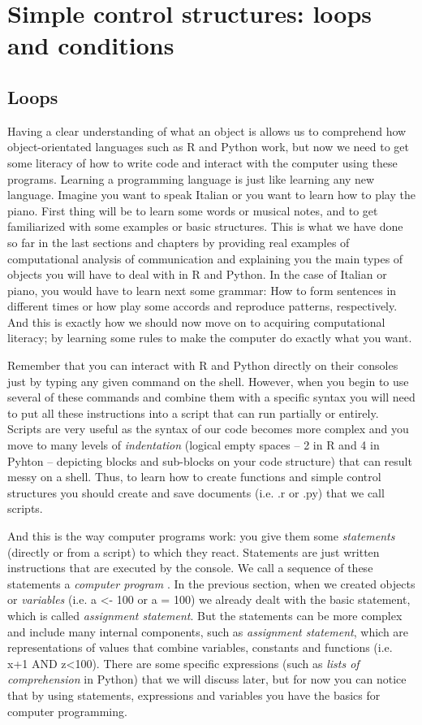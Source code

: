 \section{Simple control structures: loops and conditions}	

\subsection{Loops}
Having a clear understanding of what an object is allows us to
comprehend how object-orientated languages such as R and Python work,
but now we need to get some literacy of how to write code and interact
with the computer using these programs. Learning a programming
language is just like learning any new language.  Imagine you want to
speak Italian or you want to learn how to play the piano. First thing
will be to learn some words or musical notes, and to get familiarized
with some examples or basic structures. This is what we have done so
far in the last sections and chapters by providing real examples of
computational analysis of communication and explaining you the main
types of objects you will have to deal with in R and Python. In the
case of Italian or piano, you would have to learn next some grammar:
How to form sentences in different times or how play some accords and
reproduce patterns, respectively. And this is exactly how we should
now move on to acquiring computational literacy; by learning some
rules to make the computer do exactly what you want.

Remember that you can interact with R and Python directly on their
consoles just by typing any given command on the shell. However, when
you begin to use several of these commands and combine them with a
specific syntax you will need to put all these instructions into a
script that can run partially or entirely. Scripts are very useful as
the syntax of our code becomes more complex and you move to many
levels of \emph{indentation} (logical empty spaces -- 2 in R and 4 in
Pyhton -- depicting blocks and sub-blocks on your code structure) that
can result messy on a shell. Thus, to learn how to create functions
and simple control structures you should create and save documents
(i.e. .r or .py) that we call scripts.

And this is the way computer programs work: you give them some
\emph{statements} (directly or from a script) to which they
react. Statements are just written instructions that are executed by
the console.  We call a sequence of these statements a \emph{computer
  program} . In the previous section, when we created objects or
\emph{variables} (i.e. a \textless- 100 or a = 100) we already dealt
with the basic statement, which is called \emph{assignment
  statement}. But the statements can be more complex and include many
internal components, such as \emph{assignment statement}, which are
representations of values that combine variables, constants and
functions (i.e.  x+1 AND z\textless100). There are some specific
expressions (such as \emph{lists of comprehension} in Python) that we
will discuss later, but for now you can notice that by using
statements, expressions and variables you have the basics for computer
programming.

